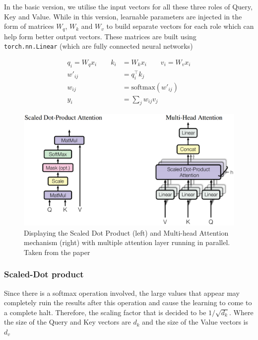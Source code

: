 \documentclass[12pt,a4paper,twoside,openright]{report}
\begin{document}
In the basic version, we utilise the input vectors for all these three roles of Query, Key and Value. While in this version, learnable parameters are injected in the form of matrices $W_q$, $W_k$ and $W_v$ to build separate vectors for each role which can help form better output vectors. These matrices are built using \\ \lstinline{torch.nn.Linear} (which are fully connected neural networks)

\begin{align*}
    q_i = W_q x_i \qquad       k_i & = W_k x_i \qquad     v_i = W_v x_i \\
    w'_{ij} & = q_i^\top k_j \\
    w_{ij} & = \text{softmax}(w'_{ij}) \\
    y_i & = \sum_j w_{ij} v_j
\end{align*}

\begin{figure}
    \centering
    \includegraphics[width=\textwidth]{figs/multihead-attention.PNG}
    \caption{Displaying the Scaled Dot Product (left) and Multi-head Attention mechanism (right) with multiple attention layer running in parallel. Taken from the paper \cite{transformers}}
    \label{fig:my_label}
\end{figure}

\subsubsection{Scaled-Dot product}

Since there is a softmax operation involved, the large values that appear may completely ruin the results after this operation and cause the learning to come to a complete halt.
Therefore, the scaling factor that is decided to be $1/\sqrt{d_k}$.
Where the size of the Query and Key vectors are $d_k$ and the size of the Value vectors is $d_v$
\end{document}
